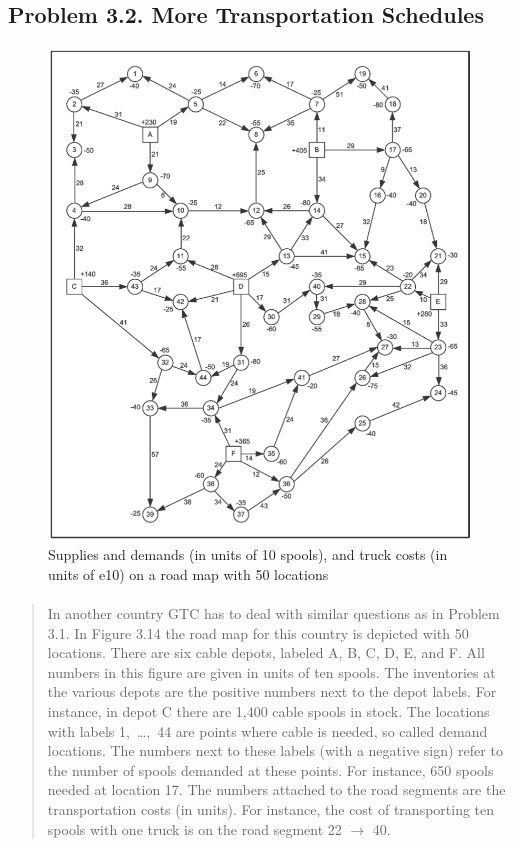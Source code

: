 \subsection{Problem 3.2. More Transportation Schedules}

\begin{figure}[H]
	\centering
	\includegraphics[scale=1]{./img/figure3-14.png}
	\caption{Supplies and demands (in units of 10 spools), and truck costs (in units of e10) on a road map with 50 locations}
	\label{network3-2}
\end{figure}

\paragraph{}
\begin{quote}
In another country GTC has to deal with similar questions as in Problem 3.1. In Figure 3.14 the road map for this country is depicted with 50 locations. There are six cable depots, labeled A, B, C, D, E, and F. All numbers in this figure are given in units of ten spools. The inventories at the various depots are the positive numbers next to the depot labels. For instance, in depot C there are 1,400 cable spools in stock. The locations with labels 1,~\dots,~44 are points where cable is needed, so called demand locations. The numbers next to these labels (with a negative sign) refer to the number of spools demanded at these points. For instance, 650 spools needed at location 17. The numbers attached to the road segments are the transportation costs (in  units). For instance, the cost of transporting ten spools with one truck is  on the road segment 22 $\rightarrow$ 40.
\end{quote}

